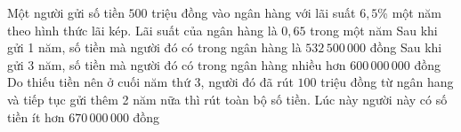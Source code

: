 \begin{ex}%
	Một người gửi số tiền $500$ triệu đồng vào ngân hàng với lãi suất $6{,}5$\% một năm  theo hình thức lãi kép.
	 \choiceTF
		{Lãi suất của ngân hàng là $0{,}65$  trong một năm}
		{\True Sau  khi gửi 1 năm, số tiền mà người đó có trong ngân hàng là $ 532\,500\,000$ đồng}
		{\True Sau khi gửi 3 năm, số tiền mà người đó có trong ngân hàng nhiều  hơn $ 600\,000\,000$ đồng}
		{Do thiếu tiền nên ở cuối năm thứ 3, người đó đã rút $100$ triệu đồng từ  ngân hang và tiếp tục gửi thêm 2 năm nữa thì rút toàn bộ số tiền. Lúc này người này có số tiền ít hơn $ 670\,000\,000$ đồng}
\end{ex}

